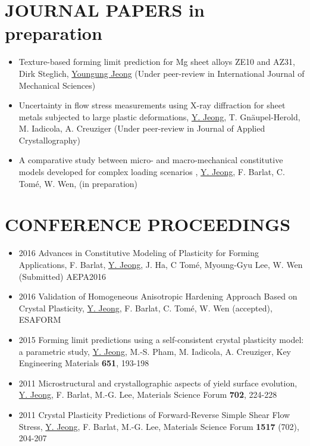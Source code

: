 \documentclass{res}
\begin{document}
\begin{resume}
  \section{JOURNAL PAPERS in preparation}
  \begin{itemize}
  \item Texture-based forming limit prediction for Mg sheet alloys ZE10 and AZ31, Dirk Steglich, \underline{Youngung Jeong} (Under peer-review in International Journal of Mechanical Sciences)
  \item Uncertainty in flow stress measurements using X-ray diffraction for sheet metals subjected to large plastic deformations, \underline{Y. Jeong}, T. Gn\"{a}upel-Herold, M. Iadicola, A. Creuziger (Under peer-review in Journal of Applied Crystallography)
  \item A comparative study between micro- and macro-mechanical constitutive models developed for complex loading scenarios , \underline{Y. Jeong}, F. Barlat, C. Tom\'{e}, W. Wen, (in preparation)
  \end{itemize}

  \section{CONFERENCE PROCEEDINGS}
  \begin{itemize}
  \item 2016 Advances in Constitutive Modeling of Plasticity for Forming Applications, F. Barlat, \underline{Y. Jeong}, J. Ha, C Tom\'{e}, Myoung-Gyu Lee, W. Wen (Submitted) AEPA2016
  \item 2016 Validation of Homogeneous Anisotropic Hardening Approach Based on Crystal Plasticity, \underline{Y. Jeong}, F. Barlat, C. Tom\'{e}, W. Wen (accepted), ESAFORM
  \item 2015 Forming limit predictions using a self-consistent crystal plasticity model: a parametric study, \underline{Y. Jeong}, M.-S. Pham, M. Iadicola, A. Creuziger, Key Engineering Materials {\bf 651}, 193-198
  \item 2011 Microstructural and crystallographic aspects of yield surface evolution, \underline{Y. Jeong}, F. Barlat, M.-G. Lee,  Materials Science Forum {\bf 702}, 224-228
  \item 2011 Crystal Plasticity Predictions of Forward-Reverse Simple Shear Flow Stress, \underline{Y. Jeong}, F. Barlat, M.-G. Lee, Materials Science Forum {\bf 1517} (702), 204-207
  \end{itemize}


\end{resume}
\end{document}
